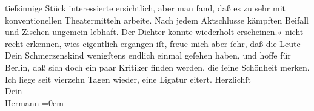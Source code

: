 \begin{ledgroupsized}[t]{13cm}
{{{                     tiefsinnige Stück interessierte ersichtlich, aber man fand, daß es zu sehr mit
                     konventionellen Theatermitteln arbeite. Nach jedem Aktschlusse kämpften Beifall
                     und Zischen ungemein lebhaft. Der Dichter konnte wiederholt
                  erscheinen.«}}}\label{K_L01276-1h} nicht recht erkennen, wies eigentlich ergangen iſt,
               freue mich aber ſehr, daß die Leute Dein Schmerzenskind wenigſtens endlich einmal geſehen haben, und
               hoffe für Berlin, daß sich doch ein paar Kritiker
               finden werden, die ſeine Schönheit merken.\pend
           \pstart
           Ich liege seit vierzehn Tagen wieder, eine Ligatur eitert.\pend
           \pstart
           Herzlichſt{\\[\baselineskip]}Dein{\\[\baselineskip]}\spacefill\mbox{Hermann}\pend
           \leftskip=0em{}
         
         \endnumbering{}\end{ledgroupsized}  \newcommand{\dateiname}{L01276}\newcommand{\titel}{Hermann Bahr an Arthur Schnitzler, 15. 3. 1903}\newcommand{\editorInnen}{ Kurt Ifkovits,  Martin Anton Müller}
      